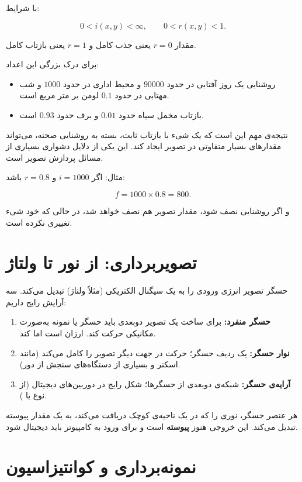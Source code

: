 \documentclass[11pt,a4paper]{article}
\begin{document}
	با شرایط:
	
	\[
	0<i(x,y)<\infty,
	\qquad
	0<r(x,y)<1.
	\]
	
	مقدار $r=0$ یعنی جذب کامل و $r=1$ یعنی بازتاب کامل.
	
	برای درک بزرگی این اعداد:
	
	\begin{itemize}
		\item روشنایی یک روز آفتابی در حدود $90000$ و محیط اداری در حدود $1000$
		و شب مهتابی در حدود $0.1$ لومن بر متر مربع است.
		\item بازتاب مخمل سیاه حدود $0.01$ و برف حدود $0.93$ است.
	\end{itemize}
	
	نتیجه‌ی مهم این است که یک شیء با بازتاب ثابت، بسته به روشنایی صحنه، می‌تواند مقدارهای بسیار
	متفاوتی در تصویر ایجاد کند. این یکی از دلایل دشواری بسیاری از مسائل پردازش تصویر است.
	
	مثال: اگر $i=1000$ و $r=0.8$ باشد:
	
	\[
	f=1000\times0.8=800.
	\]
	
	و اگر روشنایی نصف شود، مقدار تصویر هم نصف خواهد شد، در حالی که خود شیء تغییری نکرده است.
	
	
	\section{تصویربرداری: از نور تا ولتاژ}
	
	حسگر تصویر انرژی ورودی را به یک سیگنال الکتریکی (مثلاً ولتاژ) تبدیل می‌کند.
	سه آرایش رایج داریم:
	
	\begin{enumerate}
		\item \textbf{حسگر منفرد:} برای ساخت یک تصویر دوبعدی باید حسگر یا نمونه به‌صورت مکانیکی حرکت کند.
		ارزان است اما کند.
		\item \textbf{نوار حسگر:} یک ردیف حسگر؛ حرکت در جهت دیگر تصویر را کامل می‌کند
		(مانند اسکنر و بسیاری از دستگاه‌های سنجش از دور).
		\item \textbf{آرایه‌ی حسگر:} شبکه‌ی دوبعدی از حسگرها؛ شکل رایج در دوربین‌های دیجیتال
		(از نوع  یا ).
	\end{enumerate}
	
	هر عنصر حسگر، نوری را که در یک ناحیه‌ی کوچک دریافت می‌کند، به یک مقدار پیوسته تبدیل می‌کند.
	این خروجی هنوز \textbf{پیوسته} است و برای ورود به کامپیوتر باید دیجیتال شود.
	
	
	\section{نمونه‌برداری و کوانتیزاسیون}
	
\end{document}
